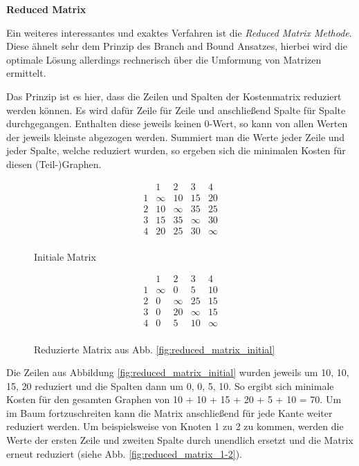\textbf{Reduced Matrix} 

Ein weiteres interessantes und exaktes Verfahren ist die \textit{Reduced Matrix Methode}. Diese ähnelt sehr dem Prinzip des Branch and Bound Ansatzes, hierbei wird die optimale Lösung allerdings rechnerisch über die Umformung von Matrizen ermittelt. 

Das Prinzip ist es hier, dass die Zeilen und Spalten der Kostenmatrix reduziert werden können. Es wird dafür Zeile für Zeile und anschließend Spalte für Spalte durchgegangen. Enthalten diese jeweils keinen 0-Wert, so kann von allen Werten der jeweils kleinste abgezogen werden. Summiert man die Werte jeder Zeile und jeder Spalte, welche reduziert wurden, so ergeben sich die minimalen Kosten für diesen (Teil-)Graphen. \cite{geeksForGeeksRm}

\begin{figure}[H]
\centering
\begin{minipage}{.5\textwidth}
  \centering
  \[
    \begin{matrix}
          & 1 & 2 & 3 & 4\\
        1 & \infty & 10 & 15 & 20\\
        2 & 10 & \infty & 35 & 25\\
        3 & 15 & 35 & \infty & 30\\
        4 & 20 & 25 & 30 & \infty\\
    \end{matrix}
    \]
    \caption{Initiale Matrix \cite{geeksForGeeksRm}}
    \label{fig:reduced_matrix_initial}
\end{minipage}%
\begin{minipage}{.5\textwidth}
  \centering
   \[
    \begin{matrix}
          & 1 & 2 & 3 & 4\\
        1 & \infty & 0 & 5 & 10\\
        2 & 0 & \infty & 25 & 15\\
        3 & 0 & 20 & \infty & 15\\
        4 & 0 & 5 & 10 & \infty\\
    \end{matrix}
    \]
    \caption{Reduzierte Matrix aus Abb. \ref{fig:reduced_matrix_initial} \cite{geeksForGeeksRm}}
    \label{fig:reduced_matrix_reduced}
\end{minipage}
\end{figure}

Die Zeilen aus Abbildung \ref{fig:reduced_matrix_initial} wurden jeweils um 10, 10, 15, 20 reduziert und die Spalten dann um 0, 0, 5, 10. So ergibt sich minimale Kosten für den gesamten Graphen von 10 + 10 + 15 + 20 + 5 + 10 = 70. Um im Baum fortzuschreiten kann die Matrix anschließend für jede Kante weiter reduziert werden. Um beispielsweise von Knoten 1 zu 2 zu kommen, werden die Werte der ersten Zeile und zweiten Spalte durch unendlich ersetzt und die Matrix erneut reduziert (siehe Abb. \ref{fig:reduced_matrix_1-2}). 

